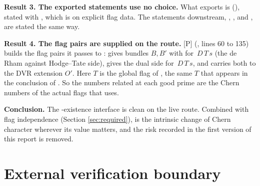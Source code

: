 \documentclass[11pt]{article}
\newcommand{\mP}{\textsf{[P]}}
\theoremstyle{remark}
\begin{document}
\textbf{Result 3. The exported statements use no choice.} What  exports is  (), stated with , which is  on explicit flag data. The statements downstream, , ,  and , are stated the same way.

\textbf{Result 4. The flag pairs are supplied on the route.} \mP{}  (, lines 60 to 135) builds the flag pairs it passes to :  gives bundles $B,B'$ with  for $\,D\,T\,s$ (the de Rham against Hodge--Tate side),  gives the dual side for $\,D\,T\,s$, and  carries both to the DVR extension $O'$. Here $T$ is the global flag of , the same $T$ that appears in the conclusion of . So the numbers related at each good prime are the Chern numbers of the actual flags that  uses.

\textbf{Conclusion.} The -existence interface is clean on the live route. Combined with flag independence (Section \ref{sec:required}),  is the intrinsic change of Chern character wherever its value matters, and the risk recorded in the first version of this report is removed.

\section{External verification boundary}\label{sec:boundary}
\end{document}

